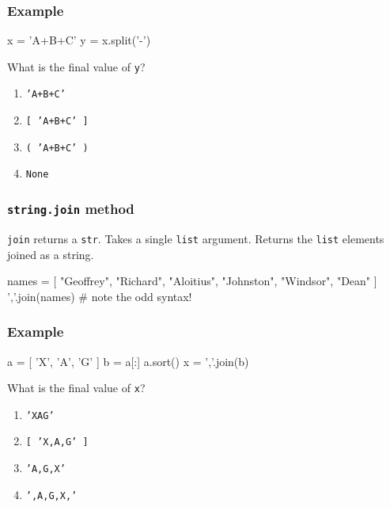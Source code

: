 \documentclass[11pt]{beamer}
\begin{document}
\begin{frame}[fragile]
  \frametitle{Example}
  \Enlarge

  \begin{semiverbatim}
x = 'A+B+C'
y = x.split('-')
  \end{semiverbatim}
  What is the final value of \texttt{y}?
  \begin{enumerate}[label=\Alph*]
  \item  \texttt{'A+B+C'}
  \item  \texttt{[ 'A+B+C' ]}
  \item  \texttt{( 'A+B+C' )}
  \item  \texttt{None}
  \end{enumerate}
\end{frame}

\begin{frame}[fragile]
  \frametitle{\texttt{string.join} method}
  \Enlarge

  \begin{itemize}
  \myitem  \texttt{join} returns a \texttt{str}.
  \myitem  Takes a single \texttt{list} argument.
  \myitem  Returns the \texttt{list} elements joined as a string.
  \end{itemize}
  \begin{semiverbatim}
names = [ "Geoffrey", "Richard", "Aloitius", "Johnston", "Windsor", "Dean" ]
','.join(names)     # note the odd syntax!
  \end{semiverbatim}
\end{frame}

\begin{frame}[fragile]
  \frametitle{Example}
  \Enlarge

  \begin{semiverbatim}
a = [ 'X', 'A', 'G' ]
b = a[:]
a.sort()
x = ','.join(b)
  \end{semiverbatim}
  What is the final value of \texttt{x}?
  \begin{enumerate}[label=\Alph*]
  \item  \texttt{'XAG'}
  \item  \texttt{[ 'X,A,G' ]}
  \item  \texttt{'A,G,X'}
  \item  \texttt{',A,G,X,'}
  \end{enumerate}
\end{frame}
\end{document}
